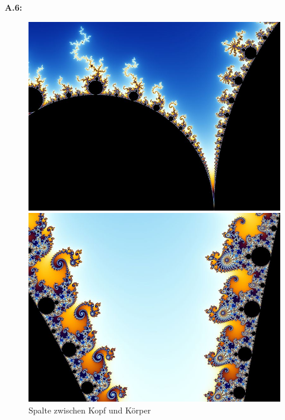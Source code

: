 \noindent\textbf{A.6:}\label{app:6}
\begin{figure}[H]\label{fig:mandelbrot-set-zoom-images}
  \centering
  \begin{minipage}[t]{0.40\textwidth}
    \centering
    \includegraphics[width=\linewidth]{images/zoom/800px-Mandel_zoom_01_head_and_shoulder}
    \vspace*{-4ex}
    \caption{Spalte zwischen Kopf und K\"orper~\cite{beyer_partial_2005}}
    \label{app:6.1}
  \end{minipage}%
  \hspace{8ex}
  \begin{minipage}[t]{0.40\textwidth}
    \centering
    \includegraphics[width=\linewidth]{images/zoom/800px-Mandel_zoom_02_seehorse_valley}

\end{minipage}
\end{figure}
